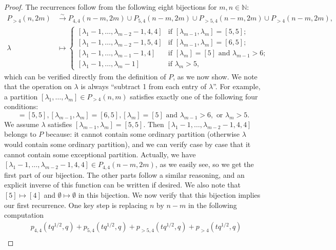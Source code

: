 \documentclass[a4paper, 12pt, reqno]{amsart}
\theoremstyle{remark}
\numberwithin{equation}{subsection}
\begin{document}
\begin{proof}
  The recurrences follow from the following eight bijections for $m, n \in \mathbb{N}$:
  \begin{align*}
    P_{>4}(n, 2m) &\xrightarrow{\sim} P_{4, 4}(n - m, 2m) \cup P_{5, 4}(n - m, 2m) \cup P_{>5, 4}(n - m, 2m) \cup P_{>4}(n - m, 2m), \\
    \lambda &\mapsto
              \begin{cases}
                [\lambda_1 - 1, \dots, \lambda_{m - 2} - 1, 4, 4] &\text{if }[\lambda_{m - 1}, \lambda_m] = [5, 5]; \\
                [\lambda_1 - 1, \dots, \lambda_{m - 2} - 1, 5, 4] &\text{if }[\lambda_{m - 1}, \lambda_m] = [6, 5]; \\
                [\lambda_1 - 1, \dots, \lambda_{m - 1} - 1, 4] &\text{if }[\lambda_m] = [5]\text{ and }\lambda_{m - 1} > 6; \\
                [\lambda_1 - 1, \dots, \lambda_m - 1] &\text{if }\lambda_m > 5,
              \end{cases}
  \end{align*}
  which can be verified directly from the definition of $P$, as we now show.
  We note that the operation on $\lambda$ is always ``subtract 1 from each entry of $\lambda$''.
  For example, a partition $[\lambda_1, \dots, \lambda_m] \in P_{>4}(n, m)$ satisfies exactly one of the following four conditions:
  \begin{equation*}
    [\lambda_{m - 1}, \lambda_m] = [5, 5], [\lambda_{m - 1}, \lambda_m] = [6, 5], [\lambda_m] = [5]\text{ and }\lambda_{m - 1} > 6,\text{ or }\lambda_m > 5.
  \end{equation*}
  We assume $\lambda$ satisfies $[\lambda_{m - 1}, \lambda_m] = [5, 5]$.
  Then $[\lambda_1 - 1, \dots, \lambda_{m - 2} - 1, 4, 4]$ belongs to $P$ because: it cannot contain some ordinary partition (otherwise $\lambda$ would contain some ordinary partition), and we can verify case by case that it cannot contain some exceptional partition.
  Actually, we have $[\lambda_1 - 1, \dots, \lambda_{m - 2} - 1, 4, 4] \in P_{4, 4}(n - m, 2m)$, as we easily see, so we get the first part of our bijection.
  The other parts follow a similar reasoning, and an explicit inverse of this function can be written if desired.
  We also note that $[5] \mapsto [4]$ and $\emptyset \mapsto \emptyset$ in this bijection.
  We now verify that this bijection implies our first recurrence.
  One key step is replacing $n$ by $n - m$ in the following computation
  \begin{align*}
    &p_{4, 4}(tq^{1/2}, q) + p_{5, 4}(tq^{1/2}, q) + p_{>5, 4}(tq^{1/2}, q) + p_{>4}(tq^{1/2}, q) \\

\end{align*}
\end{proof}
\end{document}
